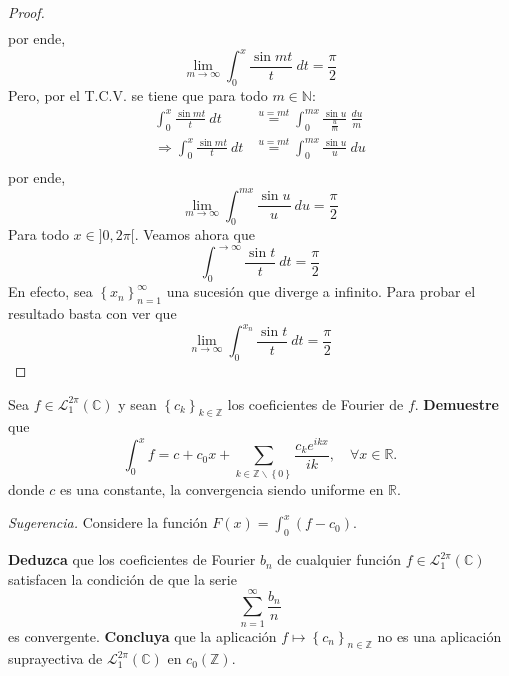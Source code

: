 \documentclass[12pt]{report}
\theoremstyle{largebreak}
\begin{document}
\begin{proof}
\begin{equation*}
\begin{split}
            \end{split}
        \end{equation*}
        por ende,
        \begin{equation*}
            \lim_{m\rightarrow\infty}\int_{0}^{x}\frac{\sin mt}{t}\:dt=\frac{\pi}{2}
        \end{equation*}
        Pero, por el T.C.V. se tiene que para todo $m\in\mathbb{N}$:
        \begin{equation*}
            \begin{split}
                \int_{0}^{x}\frac{\sin mt}{t}\:dt&\overset{u=mt}{=} \int_{0}^{mx}\frac{\sin u}{\frac{u}{m}}\: \frac{du}{m}\\
                \Rightarrow \int_{0}^{x}\frac{\sin mt}{t}\:dt&\overset{u=mt}{=} \int_{0}^{mx}\frac{\sin u}{u}\: du\\
            \end{split}
        \end{equation*}
        por ende,
        \begin{equation*}
            \lim_{m\rightarrow\infty}\int_{0}^{mx}\frac{\sin u}{u}\: du=\frac{\pi}{2}
        \end{equation*}
        Para todo $x\in]0,2\pi[$. Veamos ahora que
        \begin{equation*}
            \int_{0}^{\rightarrow\infty}\frac{\sin t}{t}\:dt=\frac{\pi}{2}
        \end{equation*}
        En efecto, sea $\left\{x_n\right\}_{ n=1}^\infty$ una sucesión que diverge a infinito. Para probar el resultado basta con ver que
        \begin{equation*}
            \lim_{ n\rightarrow\infty}\int_{0}^{x_n}\frac{\sin t}{t}\:dt=\frac{\pi}{2}
        \end{equation*}
    \end{proof}

    \begin{excer}
        Sea $f\in\mathcal{L}_1^{2\pi}(\mathbb{C})$ y sean $\left\{c_k \right\}_{ k\in\mathbb{Z}}$ los coeficientes de Fourier de $f$. \textbf{Demuestre} que
        \begin{equation*}
            \int_0^x f=c+c_0x+\sum_{ k\in\mathbb{Z}\backslash\left\{0\right\}}\frac{c_ke^{ ikx}}{ik},\quad\forall x\in\mathbb{R}.
        \end{equation*}
        donde $c$ es una constante, la convergencia siendo uniforme en $\mathbb{R}$.

        \textit{Sugerencia.} Considere la función $F(x)=\int_0^x (f-c_0)$.

        \textbf{Deduzca} que los coeficientes de Fourier $b_n$ de cualquier función $f\in\mathcal{L}_1^{2\pi}(\mathbb{C})$ satisfacen la condición de que la serie
        \begin{equation*}
            \sum_{ n=1}^\infty\frac{b_n}{n}
        \end{equation*}
        es convergente. \textbf{Concluya} que la aplicación $f\mapsto\left\{c_n \right\}_{ n\in\mathbb{Z}}$ no es una aplicación suprayectiva de $\mathcal{L}_1^{2\pi}(\mathbb{C})$ en $c_0(\mathbb{Z})$.
    \end{excer}
\end{document}
